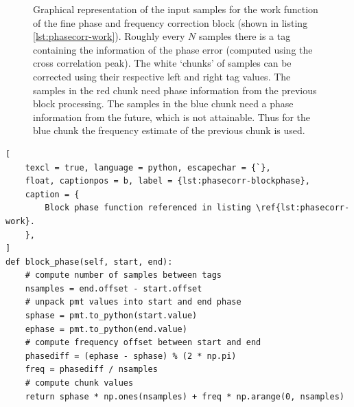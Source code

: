 \begin{figure}
	\centering
	\caption{
		Graphical representation of the input samples for the work function of the fine phase and frequency correction block (shown in listing \ref{lst:phasecorr-work}). Roughly every \(N\) samples there is a tag containing the information of the phase error (computed using the cross correlation peak). The white `chunks' of samples can be corrected using their respective left and right tag values. The samples in the red chunk need phase information from the previous block processing. The samples in the blue chunk need a phase information from the future, which is not attainable. Thus for the blue chunk the frequency estimate of the previous chunk is used.
		\label{fig:phasecorr-chunks}
	}
\end{figure}

\begin{lstlisting}[
	texcl = true, language = python, escapechar = {`},
	float, captionpos = b, label = {lst:phasecorr-blockphase},
	caption = {
		Block phase function referenced in listing \ref{lst:phasecorr-work}.
	},
]
def block_phase(self, start, end):
	# compute number of samples between tags
	nsamples = end.offset - start.offset
	# unpack pmt values into start and end phase
	sphase = pmt.to_python(start.value)
	ephase = pmt.to_python(end.value)
	# compute frequency offset between start and end
	phasediff = (ephase - sphase) % (2 * np.pi)
	freq = phasediff / nsamples
	# compute chunk values
	return sphase * np.ones(nsamples) + freq * np.arange(0, nsamples)
\end{lstlisting}


